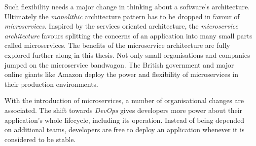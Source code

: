 Such flexibility needs a major change in thinking about a software's
architecture. Ultimately the \textit{monolithic} architecture pattern has to be
dropped in favour of \textit{microservices}. Inspired by the services oriented
architecture, the \textit{microservice architecture} favours splitting the
concerns of an application into many small parts called microservices. The
benefits of the microservice architecture are fully explored further along in
this thesis. Not only small organisations and companies jumped on the
microservice bandwagon. The British government
\autocite{LoweLeadingwaymicroservices2016} and major online giants like Amazon
\autocite{JenkinsVelocityCulture2011} deploy the power and flexibility of
microservices in their production environments.

With the introduction of microservices, a number of organisational changes are
associated. The shift towards \textit{DevOps} gives developers more power about
their application's whole lifecycle, including its operation. Instead of being
depended on additional teams, developers are free to deploy an application
whenever it is considered to be stable.



